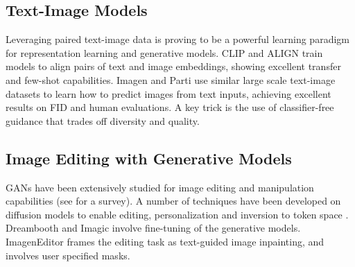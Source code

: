 \subsection{Text-Image Models}
Leveraging paired text-image data is proving to be a powerful learning paradigm for representation learning and generative models. CLIP \citep{clip} and ALIGN \citep{jia2021scaling} train models to align pairs of text and image embeddings, showing excellent transfer and few-shot capabilities. Imagen \citep{imagen} and Parti \citep{parti} use similar large scale text-image datasets \citep{laion,schuhmann2022laion} to learn how to predict images from text inputs, achieving excellent results on FID and human evaluations. A key trick is the use of classifier-free guidance \citep{ho2022classifier,dhariwal2021diffusion} that trades off diversity and quality.

\subsection{Image Editing with Generative Models}
GANs have been extensively studied for image editing and manipulation capabilities (see \citep{xia2022gan} for a survey). A number of techniques have been developed on diffusion models to enable editing, personalization and inversion to token space \citep{gal2022image, meng2021sdedit, dreambooth, imagic, brooks2022instructpix2pix, prompttoprompt, nulltext2022}. Dreambooth \citep{dreambooth} and Imagic \citep{imagic} involve fine-tuning of the generative models. ImagenEditor \citep{imageneditor} frames the editing task as text-guided image inpainting, and involves user specified masks.
